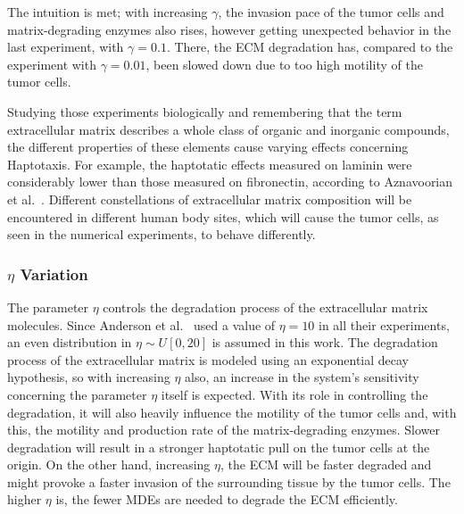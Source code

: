 The intuition is met; with increasing $\gamma$, the invasion pace of the tumor cells and matrix-degrading enzymes also rises, however getting unexpected behavior in the last experiment, with $\gamma=0.1$. There, the ECM degradation has, compared to the experiment with $\gamma=0.01$, been slowed down due to too high motility of the tumor cells.

Studying those experiments biologically and remembering that the term extracellular matrix describes a whole class of organic and inorganic compounds, the different properties of these elements cause varying effects concerning Haptotaxis. For example, the haptotatic effects measured on laminin were considerably lower than those measured on fibronectin, according to Aznavoorian et al.~\cite{article}. Different constellations of extracellular matrix composition will be encountered in different human body sites, which will cause the tumor cells, as seen in the numerical experiments, to behave differently.

\subsubsection*{$\eta$ Variation}
The parameter $\eta$ controls the degradation process of the extracellular matrix molecules. Since Anderson et al.~\cite{anderson_mathematical_2000} used a value of $\eta=10$ in all their experiments, an even distribution in $\eta \sim U[0, 20]$ is assumed in this work. The degradation process of the extracellular matrix is modeled using an exponential decay hypothesis, so with increasing $\eta$ also, an increase in the system's sensitivity concerning the parameter $\eta$ itself is expected. With its role in controlling the degradation, it will also heavily influence the motility of the tumor cells and, with this, the motility and production rate of the matrix-degrading enzymes. Slower degradation will result in a stronger haptotatic pull on the tumor cells at the origin. On the other hand, increasing $\eta$, the ECM will be faster degraded and might provoke a faster invasion of the surrounding tissue by the tumor cells. The higher $\eta$ is, the fewer MDEs are needed to degrade the ECM efficiently.

